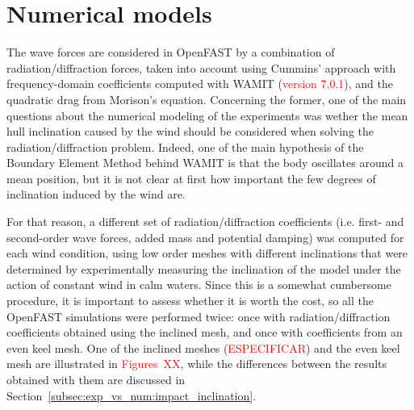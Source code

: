 \section{Numerical models} \label{sec:numerical_models}



The wave forces are considered in OpenFAST by a combination of radiation/diffraction forces, taken into account using Cummins' approach \citep{cummins1962,ogilvie1964} with frequency-domain coefficients computed with WAMIT (\textcolor{red}{version 7.0.1}), and the quadratic drag from Morison's equation. Concerning the former, one of the main questions about the numerical modeling of the experiments was wether the mean hull inclination caused by the wind should be considered when solving the radiation/diffraction problem. Indeed, one of the main hypothesis of the Boundary Element Method behind WAMIT is that the body oscillates around a mean position, but it is not clear at first how important the few degrees of inclination induced by the wind are.

For that reason, a different set of radiation/diffraction coefficients (i.e. first- and second-order wave forces, added mass and potential damping) was computed for each wind condition, using low order meshes with different inclinations that were determined by experimentally measuring the inclination of the model under the action of constant wind in calm waters. Since this is a somewhat cumbersome procedure, it is important to assess whether it is worth the cost, so all the OpenFAST simulations were performed twice: once with radiation/diffraction coefficients obtained using the inclined mesh, and once with coefficients from an even keel mesh. One of the inclined meshes (\textcolor{red}{ESPECIFICAR}) and the even keel mesh are illustrated in \textcolor{red}{Figures~XX}, while the differences between the results obtained with them are discussed in Section~\ref{subsec:exp_vs_num:impact_inclination}.
